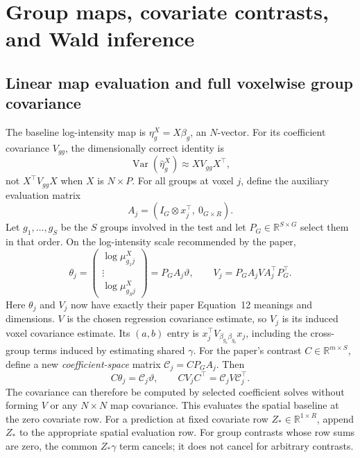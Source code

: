 \documentclass[11pt,a4paper]{article}
\newcommand{\R}{\mathbb R}
\newcommand{\Var}{\operatorname{Var}}
\numberwithin{equation}{section}
\begin{document}
\section{Group maps, covariate contrasts, and Wald inference}\label{sec:inference}

\subsection{Linear map evaluation and full voxelwise group covariance}
The baseline log-intensity map is $\eta_g^X=X\beta_g$, an $N$-vector.
For its coefficient covariance $V_{gg}$, the dimensionally correct identity is
\begin{equation}
 \Var(\widehat\eta_g^X)\approx XV_{gg}X^\top ,
 \label{eq:map-variance}
\end{equation}
not $X^\top V_{gg}X$ when $X$ is $N\times P$.
For all groups at voxel $j$, define the auxiliary evaluation matrix
\begin{equation}
 A_j=(I_G\otimes x_j^\top,\ 0_{G\times R}).
\end{equation}
Let $g_1,\ldots,g_S$ be the $S$ groups involved in the test and let
$P_G\in\R^{S\times G}$ select them in that order.
On the log-intensity scale recommended by the paper,
\begin{equation}
 \theta_j=
 \begin{pmatrix}\log\mu_{g_1j}^X\\ \vdots\\\log\mu_{g_Sj}^X\end{pmatrix}
 =P_GA_j\vartheta,\qquad
 V_j=P_GA_j V A_j^\top P_G^\top .
 \label{eq:voxel-selection}
\end{equation}
Here $\theta_j$ and $V_j$ now have exactly their paper Equation~12
meanings and dimensions. $V$ is the chosen regression covariance
estimate, so $V_j$ is its induced voxel covariance estimate.
Its $(a,b)$ entry is
$x_j^\top V_{\beta_{g_a}\beta_{g_b}}x_j$, including the cross-group
terms induced by estimating shared $\gamma$.
For the paper's contrast $C\in\R^{m\times S}$, define a new
\emph{coefficient-space} matrix $\mathcal C_j=CP_GA_j$.
Then
\begin{equation}
 C\theta_j=\mathcal C_j\vartheta,\qquad
 C V_j C^\top=\mathcal C_j V\mathcal C_j^\top .
 \label{eq:group-contrast}
\end{equation}
The covariance can therefore be computed by selected coefficient
solves without forming $V$ or any $N\times N$ map covariance.
This evaluates the spatial baseline at the zero covariate row.
For a prediction at fixed covariate row $Z_*\in\R^{1\times R}$,
append $Z_*$ to the appropriate spatial evaluation row.
For group contrasts whose row sums are zero, the common $Z_*\gamma$
term cancels; it does not cancel for arbitrary contrasts.
\end{document}
